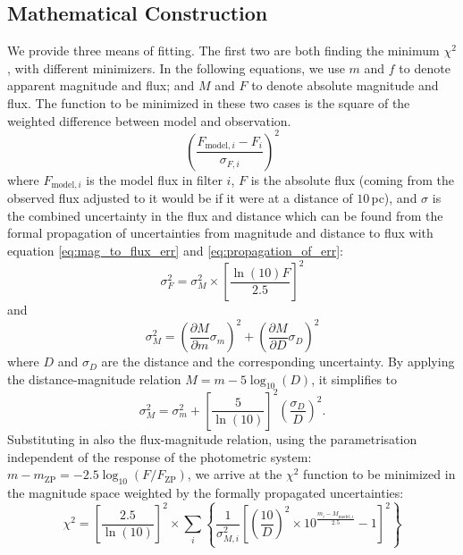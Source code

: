 \documentclass[fleqn,usenatbib]{rasti}
\begin{document}
\subsection{Mathematical Construction}
We provide three means of fitting. The first two are both finding the minimum
$\chi^2$, with different minimizers. In the following equations, we use $m$ and
$f$ to denote apparent magnitude and flux; and $M$ and $F$ to denote absolute
magnitude and flux. The function to be minimized in these two cases is the
square of the weighted difference between model and observation.
\begin{equation}
    \label{eq:lsq}
    \left(\dfrac{F_{\mathrm{model}, i} - F_{i}}{\sigma_{F, i}}\right)^{2}
\end{equation}
where $F_{\mathrm{model}, i}$ is the model flux in filter $i$, $F$ is the
absolute flux (coming from the observed flux adjusted to it would be if it
were at a distance of $10\,$pc), and $\sigma$ is the combined uncertainty in
the flux and distance which can be found from the formal propagation of
uncertainties from magnitude and distance to flux with
equation \ref{eq:mag_to_flux_err} and
\ref{eq:propagation_of_err}:
\begin{equation}
    \label{eq:mag_to_flux_err}
    \sigma_{F}^{2} = \sigma_{M}^{2} \times \left[ \dfrac{\ln(10) F}{2.5} \right]^{2}
\end{equation}
and
\begin{equation}
    \label{eq:propagation_of_err}
    \sigma_{M}^{2} = \left( \dfrac{\partial M}{\partial m} \sigma_{m} \right)^2 + \left( \dfrac{\partial M}{\partial D} \sigma_{D} \right)^2
\end{equation}
where $D$ and $\sigma_D$ are the distance and the corresponding uncertainty. By
applying the distance-magnitude relation $M = m - 5\log_{10}(D)$, it simplifies to
\begin{equation}
    \label{eq:mag_err}
    \sigma_{M}^2 = \sigma^2_{m} + \left[ \dfrac{5}{\ln(10)} \right]^2 \left(\dfrac{\sigma_{D}}{D}\right)^2.
\end{equation}
Substituting in also the flux-magnitude relation, using the parametrisation
independent of the response of the photometric system: $m - m_{\mathrm{ZP}}=-2.5\log_{10}(F/F_{\mathrm{ZP}})$,
we arrive at the $\chi^2$ function to be minimized in the magnitude space weighted
by the formally propagated uncertainties:
\begin{equation}
    \label{eq:chi2}
    \chi^{2} = \left[\dfrac{2.5}{\ln(10)}\right]^2 \times \sum_{i}\left\{ \dfrac{1}{\sigma_{M, i}^2} \left[ \left(\dfrac{10}{D}\right)^{2} \times  10^{\frac{m_{i} - M_{\mathrm{model}, i}}{2.5}} - 1 \right]^2 \right\}
\end{equation}
\end{document}

